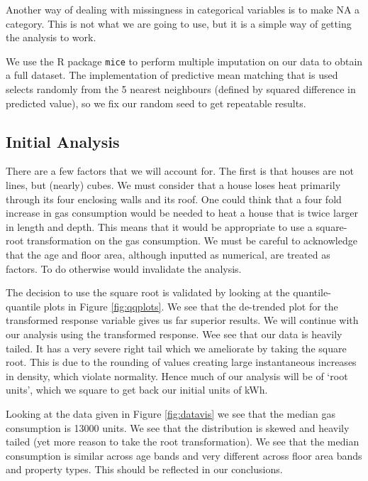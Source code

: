 \documentclass[8pt]{extarticle}
\begin{document}
Another way of dealing with missingness in categorical variables is to make NA a category. This is not what we are going to use, but it is a simple way of getting the analysis to work.

We use the R package \texttt{mice} to perform multiple imputation on our data to obtain a full dataset. The implementation of predictive mean matching that is used selects randomly from the 5 nearest neighbours (defined by squared difference in predicted value), so we fix our random seed to get repeatable results.

\subsection{Initial Analysis}

There are a few factors that we will account for. The first is that houses are not lines, but (nearly) cubes. We must consider that a house loses heat primarily through its four enclosing walls and its roof. One could think that a four fold increase in gas consumption would be needed to heat a house that is twice larger in length and depth. This means that it would be appropriate to use a square-root transformation on the gas consumption. We must be careful to acknowledge that the age and floor area, although inputted as numerical, are treated as factors. To do otherwise would invalidate the analysis.

The decision to use the square root is validated by looking at the quantile-quantile plots in Figure \ref{fig:qqplots}. We see that the de-trended plot for the transformed response variable gives us far superior results. We will continue with our analysis using the transformed response. Wee see that our data is heavily tailed. It has a very severe right tail which we ameliorate by taking the square root. This is due to the rounding of values creating large instantaneous increases in density, which violate normality. Hence much of our analysis will be of `root units', which we square to get back our initial units of kWh.

Looking at the data given in Figure \ref{fig:datavis} we see that the median gas consumption is 13000 units. We see that the distribution is skewed and heavily tailed (yet more reason to take the root transformation). We see that the median consumption is similar across age bands and very different across floor area bands and property types. This should be reflected in our conclusions. 
\end{document}
